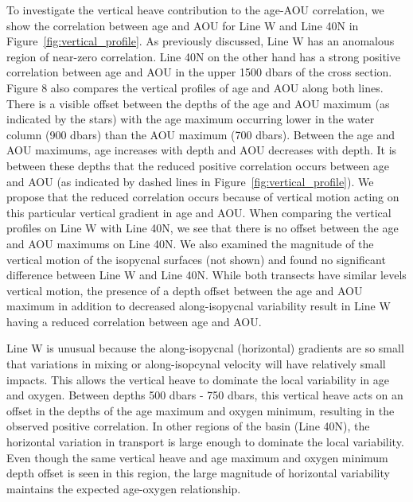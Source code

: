 To investigate the vertical heave contribution to the age-AOU correlation, we show
the correlation between age and AOU for Line W and Line 40N in Figure~\ref{fig:vertical_profile}.
As previously discussed, Line W has an anomalous region of near-zero correlation.
Line 40N on the other hand has a strong positive correlation between age and AOU
in the upper 1500 dbars of the cross section. Figure 8 also compares the vertical
profiles of age and AOU along both lines. There is a visible offset between the
depths of the age and AOU maximum (as indicated by the stars) with the age
maximum occurring lower in the water column (900 dbars) than the AOU maximum
(700 dbars). Between the age and AOU maximums, age increases with depth and AOU
decreases with depth. It is between these depths that the reduced positive
correlation occurs between age and AOU (as indicated by dashed lines in
Figure~\ref{fig:vertical_profile}). We propose that the reduced correlation occurs
because of vertical motion acting on this particular vertical gradient in age and
AOU. When comparing the vertical profiles on Line W with Line 40N, we see that
there is no offset between the age and AOU maximums on Line 40N. We also examined
the magnitude of the vertical motion of the isopycnal surfaces (not shown) and
found no significant difference between Line W and Line 40N. While both transects
have similar levels vertical motion, the presence of a depth offset between the age
and AOU maximum in addition to decreased along-isopycnal variability result in
Line W having a reduced correlation between age and AOU.

Line W is unusual because the along-isopycnal (horizontal) gradients are so small
that variations in mixing or along-isopcynal velocity will have relatively small
impacts. This allows the vertical heave to dominate the local
variability in age and oxygen. Between depths 500 dbars - 750 dbars, this vertical
heave acts on an offset in the depths of the age maximum and oxygen minimum,
resulting in the observed positive correlation. In other regions of the basin
(Line 40N), the horizontal variation in transport is large enough to dominate the local variability.
Even though the same vertical heave and age maximum and oxygen minimum depth
offset is seen in this region, the large magnitude of horizontal variability maintains
the expected age-oxygen relationship.



